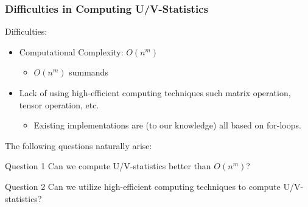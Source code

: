 \documentclass[9pt]{beamer}
\theoremstyle{mystyle}
\theoremstyle{mystyletwo}
\begin{document}
\begin{frame}
    \frametitle{Difficulties in Computing U/V-Statistics}
    Difficulties:
    \begin{itemize}
        \item Computational Complexity: $O(n^m)$
              \begin{itemize}
                  \item $O(n^m)$ summands
              \end{itemize}
        \item Lack of using high-efficient computing techniques such matrix operation, tensor operation, etc.
              \begin{itemize}
                  \item Existing implementations are (to our knowledge) all based on for-loops.
              \end{itemize}
    \end{itemize}
    The following questions naturally arise:
    \begin{block}{Question 1}
        Can we compute U/V-statistics better than $O(n^m)$?
    \end{block}
    \begin{block}{Question 2}
        Can we utilize high-efficient computing techniques to compute U/V-statistics?
    \end{block}
\end{frame}
\end{document}

